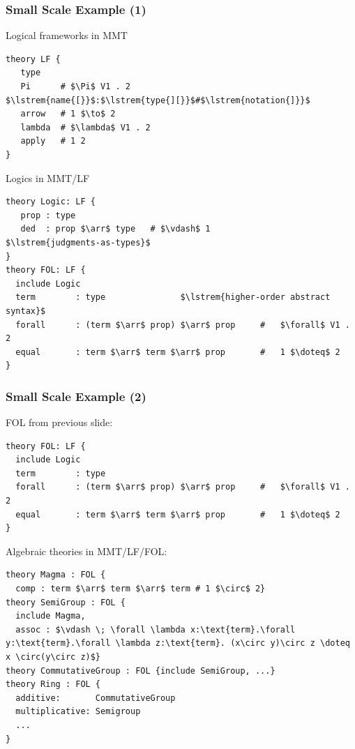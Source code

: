 \documentclass{beamer}
\begin{document}
\newcommand{\lstrem}[1]{{\color{blue}\text{#1}}}

\begin{frame}[fragile]\frametitle{Small Scale Example (1)}
Logical frameworks in MMT
\begin{lstlisting}[frame=single]
theory LF {
   type
   Pi      # $\Pi$ V1 . 2                  $\lstrem{name{[}}$:$\lstrem{type{][}}$#$\lstrem{notation{]}}$
   arrow   # 1 $\to$ 2
   lambda  # $\lambda$ V1 . 2
   apply   # 1 2
}
\end{lstlisting}

Logics in MMT/LF
\begin{lstlisting}[frame=single]
theory Logic: LF {
   prop : type
   ded  : prop $\arr$ type   # $\vdash$ 1              $\lstrem{judgments-as-types}$
}
theory FOL: LF {
  include Logic
  term        : type               $\lstrem{higher-order abstract syntax}$
  forall      : (term $\arr$ prop) $\arr$ prop     #   $\forall$ V1 . 2
  equal       : term $\arr$ term $\arr$ prop       #   1 $\doteq$ 2
}
\end{lstlisting}
\end{frame}

\begin{frame}[fragile]\frametitle{Small Scale Example (2)}
FOL from previous slide:
\begin{lstlisting}[frame=single]
theory FOL: LF {
  include Logic
  term        : type
  forall      : (term $\arr$ prop) $\arr$ prop     #   $\forall$ V1 . 2
  equal       : term $\arr$ term $\arr$ prop       #   1 $\doteq$ 2
}
\end{lstlisting}

Algebraic theories in MMT/LF/FOL:
\begin{lstlisting}[frame=single]
theory Magma : FOL {
  comp : term $\arr$ term $\arr$ term # 1 $\circ$ 2}
theory SemiGroup : FOL {
  include Magma, 
  assoc : $\vdash \; \forall \lambda x:\text{term}.\forall y:\text{term}.\forall \lambda z:\text{term}. (x\circ y)\circ z \doteq x \circ(y\circ z)$}
theory CommutativeGroup : FOL {include SemiGroup, ...}
theory Ring : FOL {
  additive:       CommutativeGroup
  multiplicative: Semigroup
  ...
}
\end{lstlisting}
\end{frame}
\end{document}
